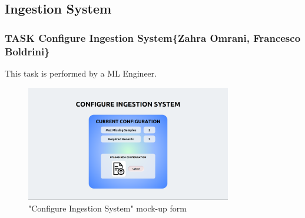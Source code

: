 \subsection{Ingestion System}

\subsubsection{TASK Configure Ingestion System\{Zahra Omrani, Francesco Boldrini\}}
This task is performed by a ML Engineer.

\begin{figure}[H]
\centering
\includegraphics[width=0.8\textwidth]{figures/ui_configure_ingestion.png}
\caption{"Configure Ingestion System" mock-up form}
\end{figure}

